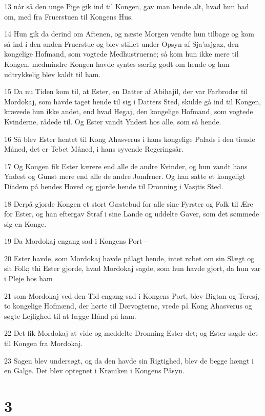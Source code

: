 \par 13 når så den unge Pige gik ind til Kongen, gav man hende alt, hvad hun bad om, med fra Fruerstuen til Kongens Hus.
\par 14 Hun gik da derind om Aftenen, og næste Morgen vendte hun tilbage og kom så ind i den anden Fruerstue og blev stillet under Opsyn af Sja'asjgaz, den kongelige Hofmand, som vogtede Medhustruerne; så kom hun ikke mere til Kongen, medmindre Kongen havde syntes særlig godt om hende og hun udtrykkelig blev kaldt til ham.
\par 15 Da nu Tiden kom til, at Ester, en Datter af Abihajil, der var Farbroder til Mordokaj, som havde taget hende til sig i Datters Sted, skulde gå ind til Kongen, krævede hun ikke andet, end hvad Hegaj, den kongelige Hofmand, som vogtede Kvinderne, rådede til. Og Ester vandt Yndest hos alle, som så hende.
\par 16 Så blev Ester hentet til Kong Ahasverus i hans kongelige Palads i den tiende Måned, det er Tebet Måned, i hans syvende Regeringsår.
\par 17 Og Kongen fik Ester kærere end alle de andre Kvinder, og hun vandt hans Yndest og Gunst mere end alle de andre Jomfruer. Og han satte et kongeligt Diadem på hendes Hoved og gjorde hende til Dronning i Vasjtis Sted.
\par 18 Derpå gjorde Kongen et stort Gæstebud for alle sine Fyrster og Folk til Ære for Ester, og han eftergav Straf i sine Lande og uddelte Gaver, som det sømmede sig en Konge.
\par 19 Da Mordokaj engang sad i Kongens Port -
\par 20 Ester havde, som Mordokaj havde pålagt hende, intet røbet om sin Slægt og sit Folk; thi Ester gjorde, hvad Mordokaj sagde, som hun havde gjort, da hun var i Pleje hos ham
\par 21 som Mordokaj ved den Tid engang sad i Kongens Port, blev Bigtan og Teresj, to kongelige Hofmænd, der hørte til Dørvogterne, vrede på Kong Ahasverus og søgte Lejlighed til at lægge Hånd på ham.
\par 22 Det fik Mordokaj at vide og meddelte Dronning Ester det; og Ester sagde det til Kongen fra Mordokaj.
\par 23 Sagen blev undersøgt, og da den havde sin Rigtighed, blev de begge hængt i en Galge. Det blev optegnet i Krøniken i Kongens Påsyn.

\chapter{3}

